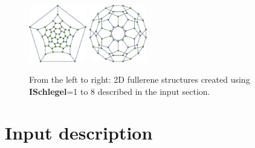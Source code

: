 \documentclass[article,a4paper,twoside]{memoir}
\newcommand{\paramname}[1]{{\color{green}\textbf{#1}}}
\begin{document}
\begin{figure}[htbp]
		 \includegraphics[width=0.225\textwidth]{Graph7.png}
		 \includegraphics[width=0.225\textwidth]{Graph8.png}
     \caption{From the left to right: 2D fullerene structures created using \paramname{ISchlegel}=1 to 8 described in the input section.}
     \label{pic:ManySchlegel}
 \end{figure}

\clearpage
\section{Input description}
\end{document}
